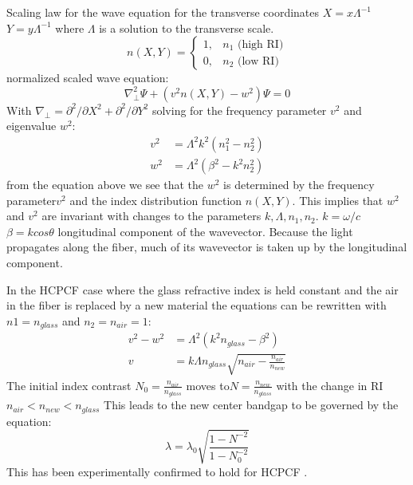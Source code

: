 Scaling law for the wave equation for the transverse coordinates
$X=x\Lambda^{-1}$ $Y=y\Lambda^{-1}$
where $\Lambda$ is a solution to the transverse scale. 
\begin{equation}
	n(X, Y) = \begin{cases}
		1, &n_1 \text{   (high RI)}\\
		0, & n_2 \text{   (low RI)}
	\end{cases}
\end{equation}
normalized scaled wave equation:
\begin{equation}
	\nabla_\perp^2\Psi + (v^2n(X, Y) - w^2)\Psi = 0
\end{equation}
With $\nabla_\perp = \partial^2/\partial X^2 + \partial^2/\partial Y^2 $
solving for the frequency parameter $v^2$ and eigenvalue $w^2$:
\begin{equation}
	\begin{aligned}
		v^2  &= \Lambda^2k^2(n_1^2 - n_2^2)\\
		w^2 &= \Lambda^2(\beta^2 - k^2n_2^2)
	\end{aligned}
\end{equation}
from the equation above we see that the $w^2$ is determined by the frequency parameter$v^2$ and the index distribution function $n(X, Y)$. This implies that $w^2$ and $v^2$ are invariant with changes to the parameters $k, \Lambda, n_1, n_2$. 
$k = \omega/c$ $\beta = kcos\theta$ longitudinal component of the wavevector. Because the light propagates along the fiber, much of its wavevector is taken up by the longitudinal component. 

In the HCPCF case where the glass refractive index is held constant and the air in the fiber is replaced by a new material the equations can be rewritten with $n1 = n_{glass}$ and $n_2 = n_{air}=1$:
\begin{equation}
	\begin{aligned}
		v^2 - w^2 &= \Lambda^2(k^2n_{glass} - \beta^2)\\
		v &= k\Lambda n_{glass}\sqrt{n_{air} - \frac{n_{air}}{n_{new}}}
	\end{aligned}
\end{equation}
The initial index contrast $N_0 = \frac{n_{air}}{n_{glass}}$ moves to$ N = \frac{n_{new}}{n_{glass}}$ with the change in RI $n_{air} <  n_{new} < n_{glass}$
This leads to the new center bandgap to be governed by the equation: 
\begin{equation}
	\lambda = \lambda_0\sqrt{\frac{1-N^{-2}}{1-N_0^{-2}}}
\end{equation}
This has been experimentally confirmed to hold for HCPCF \cite{antonopoulos}.

